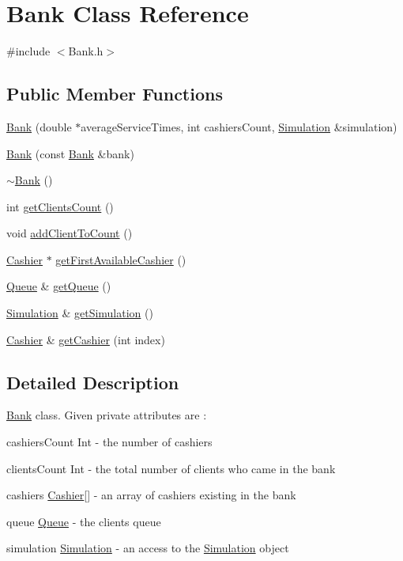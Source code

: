 \hypertarget{classBank}{}\section{Bank Class Reference}
\label{classBank}


{\ttfamily \#include $<$Bank.\+h$>$}

\subsection*{Public Member Functions}
\begin{DoxyCompactItemize}
\item 
\hyperlink{classBank_a50332ff64fd0c79823a9f3c7e7e4c18b}{Bank} (double $\ast$average\+Service\+Times, int cashiers\+Count, \hyperlink{classSimulation}{Simulation} \&simulation)
\item 
\hyperlink{classBank_affa9032a547e660fa64b773fee47f612}{Bank} (const \hyperlink{classBank}{Bank} \&bank)
\item 
\hyperlink{classBank_a86eb33b90cf9dbf0a528155c5bfde004}{$\sim$\+Bank} ()
\item 
int \hyperlink{classBank_a46e579a690e0d3ca175923fcbae30a2d}{get\+Clients\+Count} ()
\item 
void \hyperlink{classBank_a2fe9f47aabc4fe73adc07af460f30dcc}{add\+Client\+To\+Count} ()
\item 
\hyperlink{classCashier}{Cashier} $\ast$ \hyperlink{classBank_a406e1fc9b050ed4559760c5a52fe81e4}{get\+First\+Available\+Cashier} ()
\item 
\hyperlink{classQueue}{Queue} \& \hyperlink{classBank_a79644f520ee9fafdfa1ffa303b84bb4a}{get\+Queue} ()
\item 
\hyperlink{classSimulation}{Simulation} \& \hyperlink{classBank_a8d181c1cfdea6b987602f9e2954cb7ad}{get\+Simulation} ()
\item 
\hyperlink{classCashier}{Cashier} \& \hyperlink{classBank_a7eb0b71ef408a8e9798eb1d28e1733ea}{get\+Cashier} (int index)
\end{DoxyCompactItemize}


\subsection{Detailed Description}
\hyperlink{classBank}{Bank} class. Given private attributes are \+:
\begin{DoxyItemize}
\item cashiers\+Count Int -\/ the number of cashiers
\item clients\+Count Int -\/ the total number of clients who came in the bank
\item cashiers \hyperlink{classCashier}{Cashier}\mbox{[}\mbox{]} -\/ an array of cashiers existing in the bank
\item queue \hyperlink{classQueue}{Queue} -\/ the clients\textquotesingle{} queue
\item simulation \hyperlink{classSimulation}{Simulation} -\/ an access to the \hyperlink{classSimulation}{Simulation} object 
\end{DoxyItemize}

